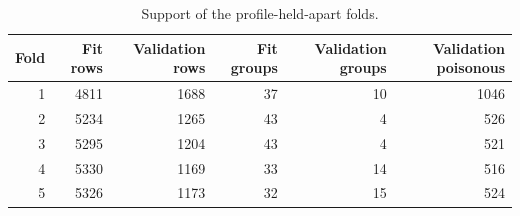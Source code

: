 \begin{table}[H]
\centering\small
\caption{Support of the profile-held-apart folds.}
\begin{tabular}{rrrrrr}
\toprule
Fold & Fit rows & Validation rows & Fit groups & Validation groups & Validation poisonous \\
\midrule
1 & 4811 & 1688 & 37 & 10 & 1046 \\
2 & 5234 & 1265 & 43 & 4 & 526 \\
3 & 5295 & 1204 & 43 & 4 & 521 \\
4 & 5330 & 1169 & 33 & 14 & 516 \\
5 & 5326 & 1173 & 32 & 15 & 524 \\
\bottomrule
\end{tabular}
\end{table}
